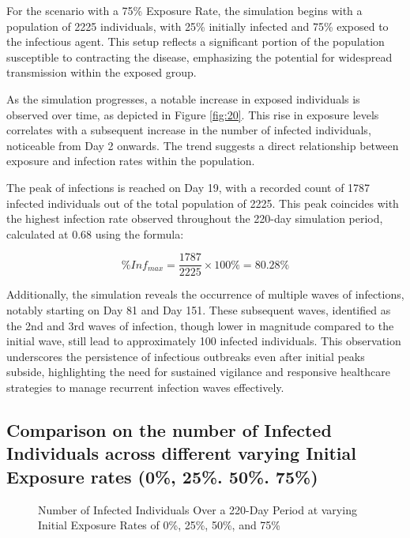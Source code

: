 For the scenario with a 75\% Exposure Rate, the simulation begins with a population of 2225 individuals, with 25\% initially infected and 75\% exposed to the infectious agent. This setup reflects a significant portion of the population susceptible to contracting the disease, emphasizing the potential for widespread transmission within the exposed group.

As the simulation progresses, a notable increase in exposed individuals is observed over time, as depicted in Figure \ref{fig:20}. This rise in exposure levels correlates with a subsequent increase in the number of infected individuals, noticeable from Day 2 onwards. The trend suggests a direct relationship between exposure and infection rates within the population.

The peak of infections is reached on Day 19, with a recorded count of 1787 infected individuals out of the total population of 2225. This peak coincides with the highest infection rate observed throughout the 220-day simulation period, calculated at 0.68 using the formula:

\[ \%Inf_{max} = \frac{1787}{2225}\times 100\%  = 80.28\%\]

Additionally, the simulation reveals the occurrence of multiple waves of infections, notably starting on Day 81 and Day 151. These subsequent waves, identified as the 2nd and 3rd waves of infection, though lower in magnitude compared to the initial wave, still lead to approximately 100 infected individuals. This observation underscores the persistence of infectious outbreaks even after initial peaks subside, highlighting the need for sustained vigilance and responsive healthcare strategies to manage recurrent infection waves effectively.


\subsection{ Comparison on the number of Infected Individuals across different varying Initial Exposure rates (0\%, 25\%. 50\%. 75\%)}
\begin{figure}[H]
	\centering
	\quad
	
	\quad
	
	\caption{Number of Infected Individuals Over a 220-Day Period at varying Initial Exposure Rates of 0\%, 25\%, 50\%, and 75\%}
	\label{E4}
\end{figure}

